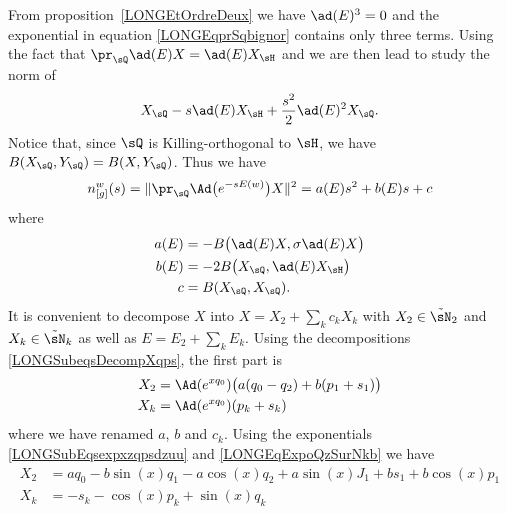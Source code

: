 %
From proposition~\ref{LONGEtOrdreDeux} we have $\ad(E)^3=0$ and the exponential in equation \eqref{LONGEqprSqbignor} contains only three terms. Using the fact that $\pr_{\sQ}\ad(E)X=\ad(E)X_{\sH}$ and  we are then lead to study the norm of
\begin{equation}
    X_{\sQ}-s\ad(E)X_{\sH}+\frac{ s^2 }{2}\ad(E)^2X_{\sQ}.
\end{equation}
Notice that, since $\sQ$ is Killing-orthogonal to $\sH$, we have $B(X_{\sQ},Y_{\sQ})=B(X,Y_{\sQ})$. Thus we have
\begin{equation}
    n_{[g]}^w(s)=\|   \pr_{\sQ} \Ad\big(  e^{-s E(w)} \big)X  \|^2=a(E)s^2+b(E)s+c
\end{equation}
where
\begin{subequations}        \label{LONGSubEqsabcEBBB}
    \begin{align}
        a(E)&=-B\big( \ad(E)X,\sigma\ad(E)X \big)        \label{LONGEqCoefaEBX}\\
        b(E)&=-2B\big( X_{\sQ},\ad(E)X_{\sH} \big)\\
        c&=B(X_{\sQ},X_{\sQ}).
    \end{align}
\end{subequations}
%
%
It is convenient to decompose $X$ into $X=X_2+\sum_kc_kX_k$ with $X_2\in\tilde\sN_2$ and $X_k\in\tilde\sN_k$ as well as $E=E_2+\sum_kE_k$. Using the decompositions \eqref{LONGSubeqsDecompXqps}, the first part is
\begin{equation}
    \begin{aligned}[]
        X_2&=\Ad( e^{xq_0})\big( a(q_0-q_2)+b(p_1+s_1) \big)    \label{LONGEqXsiAdSTrois}\\
        X_k&=\Ad( e^{xq_0})(p_k+s_k)
    \end{aligned}
\end{equation}
%
where we have renamed $a$, $b$ and $c_k$. Using the exponentials \eqref{LONGSubEqsexpxzqpsdzuu} and \eqref{LONGEqExpoQzSurNkb} we have
\begin{subequations}
    \begin{align}
        X_2 &= aq_0-b\sin(x)q_1-a\cos(x)q_2 +a\sin(x)J_1+b s_1+b\cos(x)p_1    \label{LONGsubEqXtroisdonne}\\
        X_k &= -s_k-\cos(x)p_k+\sin(x)q_k                    \label{LONGsubEqXkdonne}
    \end{align}
\end{subequations}

